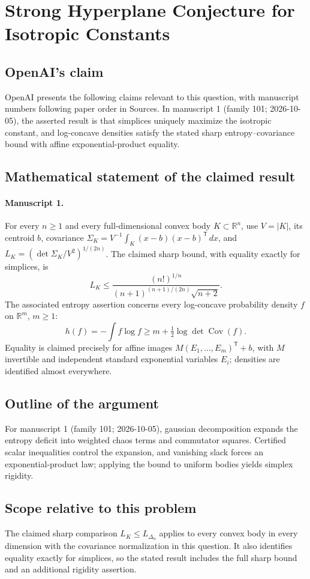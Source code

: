 \documentclass[11pt]{article}
\begin{document}
\section*{Strong Hyperplane Conjecture for Isotropic Constants}

\subsection{OpenAI's claim}
OpenAI presents the following claims relevant to this question, with manuscript numbers following paper order in Sources. In manuscript 1 (family 101; 2026-10-05), the asserted result is that simplices uniquely maximize the isotropic constant, and log-concave densities satisfy the stated sharp entropy--covariance bound with affine exponential-product equality.

\subsection{Mathematical statement of the claimed result}
\paragraph{Manuscript 1.}
For every $n\ge1$ and every full-dimensional convex body $K\subset\mathbb R^n$, use $V=|K|$, its centroid $b$, covariance $\Sigma_K=V^{-1}\int_K(x-b)(x-b)^{\mathsf T}\,dx$, and $L_K=(\det\Sigma_K/V^2)^{1/(2n)}$. The claimed sharp bound, with equality exactly for simplices, is
\[
 L_K\le\frac{(n!)^{1/n}}{(n+1)^{(n+1)/(2n)}\sqrt{n+2}}.
\]
The associated entropy assertion concerns every log-concave probability density $f$ on $\mathbb R^m$, $m\ge1$:
\[
 h(f)=-\int f\log f\ge m+\tfrac12\log\det\operatorname{Cov}(f).
\]
Equality is claimed precisely for affine images $M(E_1,\ldots,E_m)^{\mathsf T}+b$, with $M$ invertible and independent standard exponential variables $E_i$; densities are identified almost everywhere.

\subsection{Outline of the argument}
For manuscript 1 (family 101; 2026-10-05), gaussian decomposition expands the entropy deficit into weighted chaos terms and commutator squares. Certified scalar inequalities control the expansion, and vanishing slack forces an exponential-product law; applying the bound to uniform bodies yields simplex rigidity.

\subsection{Scope relative to this problem}
The claimed sharp comparison $L_K\le L_{\Delta_n}$ applies to every convex body in every dimension with the covariance normalization in this question. It also identifies equality exactly for simplices, so the stated result includes the full sharp bound and an additional rigidity assertion.
\end{document}
